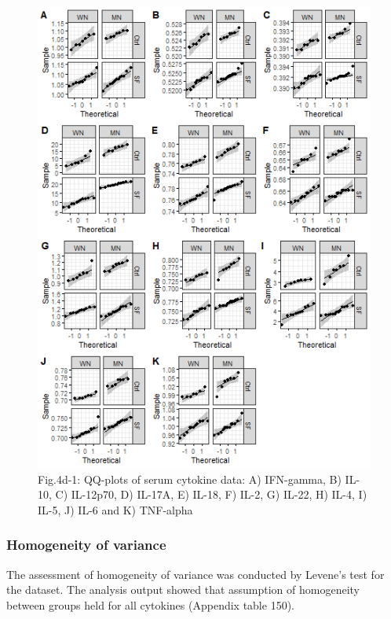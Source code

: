 \documentclass[
  12pt,
  letterpaper,
]{article}
\begin{document}
\begin{figure}[H]

{\centering \includegraphics[width=0.95\linewidth,]{Statistics_Report_files/figure-latex/qq-plot-figure-4d-1} 

}

\caption{Fig.4d-1: QQ-plots of serum cytokine data: A) IFN-gamma, B) IL-10, C) IL-12p70, D) IL-17A, E) IL-18, F) IL-2, G) IL-22, H) IL-4, I) IL-5, J) IL-6 and K) TNF-alpha}\label{fig:qq-plot-figure-4d}
\end{figure}

\subsubsection{Homogeneity of variance}\label{homogeneity-of-variance-5}

The assessment of homogeneity of variance was conducted by Levene's test for the dataset. The analysis output showed that assumption of homogeneity between groups held for all cytokines (Appendix table 150).
\end{document}

